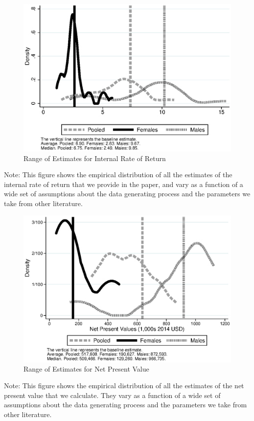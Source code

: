 \documentclass[static]{JJH-Beamer}
\begin{document}

\begin{figure}[H]
\caption{Range of Estimates for Internal Rate of Return}
\begin{center}
\includegraphics[width=.7\columnwidth]{output/overalldist_BCRatio.eps}
\end{center}
\end{figure}
{\flushleft \scriptsize Note: This figure shows the empirical distribution of all the estimates of the internal rate of return that we provide in the paper, and vary as a function of a wide set of assumptions about the data generating process and the parameters we take from other literature.\\}


\begin{figure}[H]
\caption{Range of Estimates for Net Present Value}
\begin{center}
\includegraphics[width=.7\columnwidth]{output/overalldist_npv.eps}
\end{center}
\end{figure}
{\flushleft \scriptsize Note: This figure shows the empirical distribution of all the estimates of the net present value that we calculate. They vary as a function of a wide set of assumptions about the data generating process and the parameters we take from other literature.\\}
\end{document}
